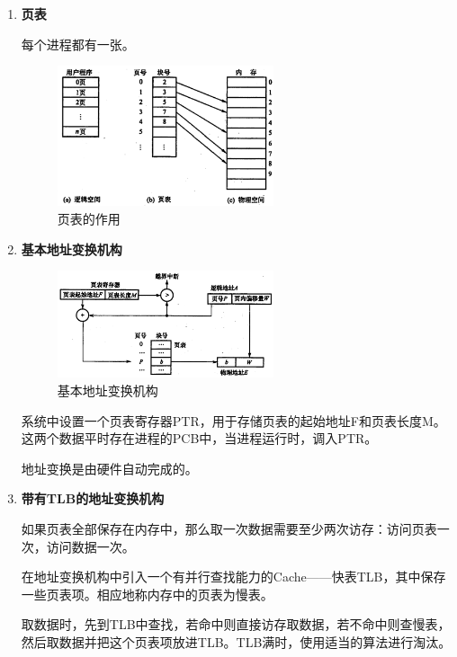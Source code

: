 \documentclass[12pt, a4paper, oneside]{ctexart}
\begin{document}
\begin{enumerate}
  \item {\bf 页表}
  
  每个进程都有一张。

  \begin{figure}[h]
    \centering
    \includegraphics[width=0.6\textwidth]{./images/page-table.png}
    \caption{页表的作用}
  \end{figure}

  \item {\bf 基本地址变换机构}
  
  \begin{figure}[h]
    \centering
    \includegraphics[width=0.6\textwidth]{./images/addr-translate.png}
    \caption{基本地址变换机构}
  \end{figure}

  系统中设置一个页表寄存器PTR，用于存储页表的起始地址F和页表长度M。这两个数据平时存在进程的PCB中，当进程运行时，调入PTR。

  地址变换是由硬件自动完成的。

  \item {\bf 带有TLB的地址变换机构}
  
  如果页表全部保存在内存中，那么取一次数据需要至少两次访存：访问页表一次，访问数据一次。

  在地址变换机构中引入一个有并行查找能力的Cache——快表TLB，其中保存一些页表项。相应地称内存中的页表为慢表。
  
  取数据时，先到TLB中查找，若命中则直接访存取数据，若不命中则查慢表，然后取数据并把这个页表项放进TLB。TLB满时，使用适当的算法进行淘汰。


\end{enumerate}
\end{document}
